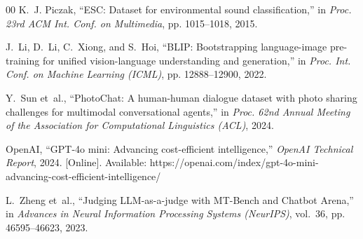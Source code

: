 \documentclass[conference]{IEEEtran}
\begin{document}
\begin{thebibliography}{00}
K.~J. Piczak, ``ESC: Dataset for environmental sound classification,'' in \emph{Proc. 23rd ACM Int. Conf. on Multimedia}, pp. 1015--1018, 2015.

J.~Li, D.~Li, C.~Xiong, and S.~Hoi, ``BLIP: Bootstrapping language-image pre-training for unified vision-language understanding and generation,'' in \emph{Proc. Int. Conf. on Machine Learning (ICML)}, pp. 12888--12900, 2022.

Y.~Sun et~al., ``PhotoChat: A human-human dialogue dataset with photo sharing challenges for multimodal conversational agents,'' in \emph{Proc. 62nd Annual Meeting of the Association for Computational Linguistics (ACL)}, 2024.

OpenAI, ``GPT-4o mini: Advancing cost-efficient intelligence,'' \emph{OpenAI Technical Report}, 2024. [Online]. Available: https://openai.com/index/gpt-4o-mini-advancing-cost-efficient-intelligence/

L.~Zheng et~al., ``Judging LLM-as-a-judge with MT-Bench and Chatbot Arena,'' in \emph{Advances in Neural Information Processing Systems (NeurIPS)}, vol.~36, pp. 46595--46623, 2023.

\end{thebibliography}
\end{document}
